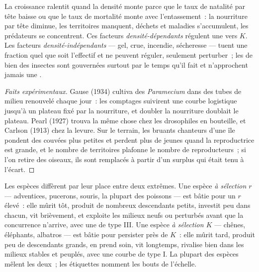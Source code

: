 \begin{proposition}\label{prop:b1:populations:densitydependence}
La croissance ralentit quand la densité monte parce que le taux de
natalité par tête baisse ou que le taux de mortalité monte avec
l'entassement~: la nourriture par tête diminue, les territoires
manquent, déchets et maladies s'accumulent, les prédateurs se
concentrent. Ces facteurs \emph{densité-dépendants} régulent une
 vers $K$. Les facteurs \emph{densité-indépendants} --- gel,
crue, incendie, sécheresse --- tuent une fraction quel que soit
l'effectif et ne peuvent réguler, seulement perturber~; les 
de bien des insectes sont gouvernées surtout par le temps qu'il fait et
n'approchent jamais une .
\end{proposition}
\begin{proof}[Faits expérimentaux]
Gause (1934) cultiva des \emph{Paramecium} dans des tubes de milieu
renouvelé chaque jour~: les comptages suivirent une courbe logistique
jusqu'à un plateau fixé par la nourriture, et doubler la nourriture
doublait le plateau. Pearl (1927) trouva la même chose chez les
drosophiles en bouteille, et Carlson (1913) chez la levure. Sur le
terrain, les bruants chanteurs d'une île pondent des couvées plus
petites et perdent plus de jeunes quand la  reproductrice est
grande, et le nombre de territoires plafonne le nombre de reproducteurs~;
si l'on retire des oiseaux, ils sont remplacés à partir d'un surplus
qui était tenu à l'écart.
\end{proof}

\begin{definition}\label{def:b1:populations:rK}
Les espèces diffèrent par leur place entre deux extrêmes. Une espèce
\emph{à sélection $r$} --- adventices, pucerons, souris, la plupart des
poissons --- est bâtie pour un $r$ élevé~: elle mûrit tôt, produit de
nombreux descendants petits, investit peu dans chacun, vit brièvement,
et exploite les milieux neufs ou perturbés avant que la concurrence
n'arrive, avec une  de type III. Une espèce \emph{à sélection $K$}
--- chênes, éléphants, albatros --- est bâtie pour persister près de
$K$~: elle mûrit tard, produit peu de descendants grands, en prend soin,
vit longtemps, rivalise bien dans les milieux stables et peuplés, avec
une courbe de type I. La plupart des espèces mêlent les deux~; les
étiquettes nomment les bouts de l'échelle.
\end{definition}

